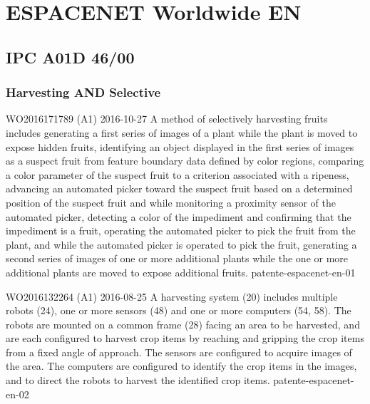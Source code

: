 
\chapter{ESPACENET Worldwide EN}
\label{chap:espacenet-en}

\section{IPC A01D 46/00}
\label{sec:ipc-a01d-4600}

\subsection{Harvesting AND Selective}
\label{sec:harvesting-selective}



{WO2016171789 (A1)}%
{2016-10-27}%
{A method of selectively harvesting fruits includes generating a first series of
  images of a plant while the plant is moved to expose hidden fruits,
  identifying an object displayed in the first series of images as a suspect
  fruit from feature boundary data defined by color regions, comparing a color
  parameter of the suspect fruit to a criterion associated with a ripeness,
  advancing an automated picker toward the suspect fruit based on a determined
  position of the suspect fruit and while monitoring a proximity sensor of the
  automated picker, detecting a color of the impediment and confirming that the
  impediment is a fruit, operating the automated picker to pick the fruit from
  the plant, and while the automated picker is operated to pick the fruit,
  generating a second series of images of one or more additional plants while
  the one or more additional plants are moved to expose additional
  fruits.}%
{patente-espacenet-en-01}%


{WO2016132264 (A1)}%
{2016-08-25}%
{A harvesting system (20) includes multiple robots (24), one or more sensors
  (48) and one or more computers (54, 58). The robots are mounted on a common
  frame (28) facing an area to be harvested, and are each configured to harvest
  crop items by reaching and gripping the crop items from a fixed angle of
  approach. The sensors are configured to acquire images of the area. The
  computers are configured to identify the crop items in the images, and to
  direct the robots to harvest the identified crop items.}%
{patente-espacenet-en-02}%


